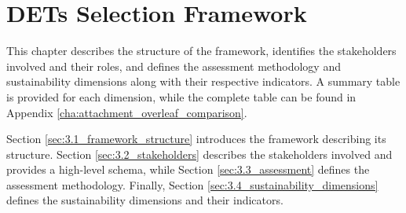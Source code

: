\chapter{DETs Selection Framework}
\label{cha:3_framework}
This chapter describes the structure of the framework, identifies the stakeholders involved and their roles, and defines the assessment methodology and sustainability dimensions along with their respective indicators. A summary table is provided for each dimension, while the complete table can be found in Appendix \ref{cha:attachment_overleaf_comparison}.

Section \ref{sec:3.1_framework_structure} introduces the framework describing its structure. Section \ref{sec:3.2_stakeholders} describes the stakeholders involved and provides a high-level schema, while Section \ref{sec:3.3_assessment} defines the assessment methodology. Finally, Section \ref{sec:3.4_sustainability_dimensions} defines the sustainability dimensions and their indicators.

